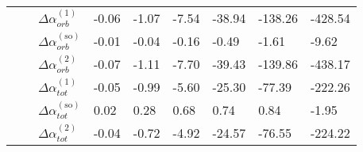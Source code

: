 \begin{longtable}{lllllllll}
      &         & $\Delta \alpha_{orb}^{(\text{1})}$ &     -0.06 &          -1.07 &          -7.54 &         -38.94 &        -138.26 &        -428.54 \\
      &         & $\Delta \alpha_{orb}^{(\text{so})}$ &     -0.01 &          -0.04 &          -0.16 &          -0.49 &          -1.61 &          -9.62 \\
      &         & $\Delta \alpha_{orb}^{(\text{2})}$ &     -0.07 &          -1.11 &          -7.70 &         -39.43 &        -139.86 &        -438.17 \\
      &         & $\Delta \alpha_{tot}^{(\text{1})}$ &     -0.05 &          -0.99 &          -5.60 &         -25.30 &         -77.39 &        -222.26 \\
      &         & $\Delta \alpha_{tot}^{(\text{so})}$ &      0.02 &           0.28 &           0.68 &           0.74 &           0.84 &          -1.95 \\
      &         & $\Delta \alpha_{tot}^{(\text{2})}$ &     -0.04 &          -0.72 &          -4.92 &         -24.57 &         -76.55 &        -224.22 \\
\end{longtable}
